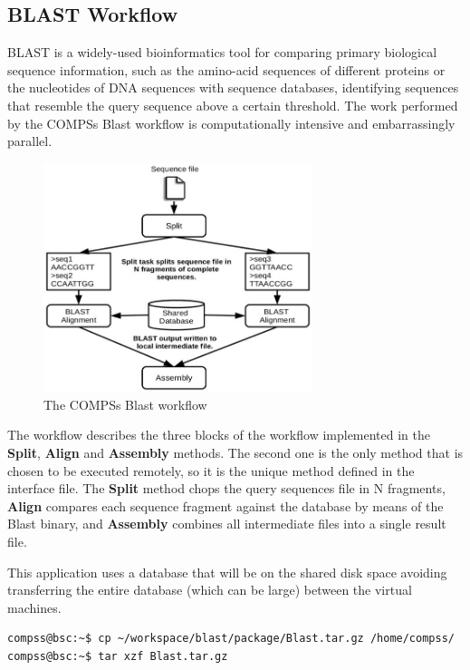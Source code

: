 \subsection{BLAST Workflow}
BLAST is a widely-used bioinformatics tool for comparing primary biological sequence information, such as 
the amino-acid sequences of different proteins or the nucleotides of DNA sequences with sequence databases, 
identifying sequences that resemble the query sequence above a certain threshold. 
The work performed by the COMPSs Blast workflow is computationally intensive and embarrassingly parallel.

\begin{figure}[ht!]
  \centering
    \includegraphics[width=0.7\textwidth]{./Sections/2_Java/Figures/blast_workflow.jpeg}
    \caption{The COMPSs Blast workflow}
    \label{fig:BLAST_workflow}
\end{figure}

The workflow describes the three blocks of the workflow implemented in the {\bf Split}, {\bf Align} and 
{\bf Assembly} methods. The second one is the only method that is chosen to be executed remotely, so it 
is the unique method defined in the interface file. The {\bf Split} method chops the query sequences file 
in N fragments, {\bf Align} compares each sequence fragment against the database by means of the Blast 
binary, and {\bf Assembly} combines all intermediate files into a single result file.

This application uses a database that will be on the shared disk space avoiding transferring the entire 
database (which can be large) between the virtual machines.

\begin{lstlisting}[language=bash]
compss@bsc:~$ cp ~/workspace/blast/package/Blast.tar.gz /home/compss/
compss@bsc:~$ tar xzf Blast.tar.gz
\end{lstlisting}

